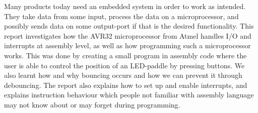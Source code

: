 Many products today need an embedded system in order to work as
intended. They take data from some input, process the data on a
microprocessor, and possibly sends data on some output-port if that is
the desired functionality. This report investigates how the AVR32
microprocessor from Atmel handles I/O and interrupts at assembly level,
as well as how programming such a microprocessor works. This was done by
creating a small program in assembly code where the user is able to
control the position of an LED-paddle by pressing buttons.  We also
learnt how and why bouncing occurs and how we can prevent it through
debouncing. The report also explains how to set up and enable
interrupts, and explains instruction behaviour which people not familiar
with assembly language may not know about or may forget during
programming.

